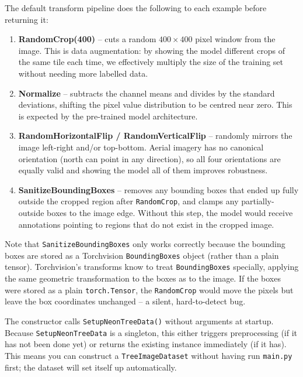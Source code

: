\documentclass[11pt, a4paper]{article}
\newenvironment{note}{%
  \begin{tcolorbox}[
    colback=notebg, colframe=noteframe,
    fonttitle=\bfseries, title=Note,
    breakable, enhanced
  ]
}{%
  \end{tcolorbox}
}
\begin{document}
The default transform pipeline does the following to each example before
returning it:

\begin{enumerate}[nosep]
  \item \textbf{RandomCrop(400)} -- cuts a random $400 \times 400$ pixel
        window from the image. This is data augmentation: by showing the model
        different crops of the same tile each time, we effectively multiply the
        size of the training set without needing more labelled data.
  \item \textbf{Normalize} -- subtracts the channel means and divides by
        the standard deviations, shifting the pixel value distribution to be
        centred near zero. This is expected by the pre-trained model
        architecture.
  \item \textbf{RandomHorizontalFlip / RandomVerticalFlip} -- randomly mirrors
        the image left-right and/or top-bottom. Aerial imagery has no canonical
        orientation (north can point in any direction), so all four orientations
        are equally valid and showing the model all of them improves robustness.
  \item \textbf{SanitizeBoundingBoxes} -- removes any bounding boxes that
        ended up fully outside the cropped region after \texttt{RandomCrop},
        and clamps any partially-outside boxes to the image edge. Without this
        step, the model would receive annotations pointing to regions that do
        not exist in the cropped image.
\end{enumerate}

Note that \texttt{SanitizeBoundingBoxes} only works correctly because the
bounding boxes are stored as a Torchvision \texttt{BoundingBoxes} object
(rather than a plain tensor). Torchvision's transforms know to treat
\texttt{BoundingBoxes} specially, applying the same geometric transformation
to the boxes as to the image. If the boxes were stored as a plain
\texttt{torch.Tensor}, the \texttt{RandomCrop} would move the pixels but
leave the box coordinates unchanged -- a silent, hard-to-detect bug.

\begin{note}
  The constructor calls \texttt{SetupNeonTreeData()} without arguments at
  startup. Because \texttt{SetupNeonTreeData} is a singleton, this either
  triggers preprocessing (if it has not been done yet) or returns the existing
  instance immediately (if it has). This means you can construct a
  \texttt{TreeImageDataset} without having run \texttt{main.py} first; the
  dataset will set itself up automatically.
\end{note}
\end{document}
